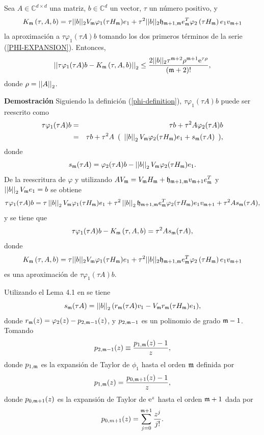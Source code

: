  \begin{lemma}\cite{naranjo2021locally}\label{lemma:CORRECTED-ERROR}
	Sea $A\in\mathbb{C}^{d\times d}$ una matriz, $b\in\mathbb{C}^{d}$ un vector, $\tau$ un número positivo, y \[{K_{\mathfrak{m}}\left(\tau,A , b \right) = \tau ||b||_2 V_{\mathfrak{m}} \varphi_1(\tau H_{\mathfrak{m}})e_1}+\tau^2 ||b||_2 \mathfrak{h}_{\mathfrak{m}+1,\mathfrak{m}}e_{\mathfrak{m}}^T\varphi_2\left(\tau H_{\mathfrak{m}}\right) e_1 v_{\mathfrak{m}+1} \] la aproximación a $\tau \varphi_1(\tau A)b$ tomando los dos primeros términos de la serie (\ref{PHI-EXPANSION}). Entonces,
	\begin{gather*}
	\left\lvert\left\lvert \tau\varphi_1(\tau A)b - K_{\mf}\left(\tau,A , b \right) \right\rvert\right\rvert_2%
	\leq \frac{2\vert\lvert b \rvert\rvert_2\tau^{\mf+2}\rho^{\mf+1}\me{\tau \rho}}{(\mf+2)!},
	\end{gather*}
	donde $\rho=\left\lvert \left\lvert A \right\rvert \right\rvert_2$.
\end{lemma}
\textbf{Demostración}
Siguiendo la definición (\ref{phi-definition}), $\tau \varphi_1(\tau A)b$ puede ser reescrito como
\begin{eqnarray*}
	\tau \varphi_1(\tau A)b &=& \tau b+\tau^{2}A\varphi_{2}(\tau A)b \\
	&=& \tau b+\tau^{2}A \,\ (\,\ \nnorm{\nnorm{b}}_2V_\mf\varphi_{2}(\tau H_\mf)e_1 +s_\mf(\tau A) \,\ ), %
\end{eqnarray*}
donde \[ s_{\mathfrak{m}} (\tau A)= \varphi_{2}(\tau A)b -\left\lvert \left\lvert b \right\rvert \right\rvert_2V_{\mathfrak{m}}\varphi_{2}(\tau H_{\mathfrak{m}})e_1 .\]
De la reescritura de $\varphi$ y utilizando $AV_{\mathfrak{m}}=V_{\mathfrak{m}} H_{\mathfrak{m}} + \mathfrak{h}_{\mathfrak{m}+1,\mathfrak{m}}v_{\mathfrak{m}+1}e^{T}_{\mathfrak{m}}$ y  $\left\lvert \left\lvert b \right\rvert \right\rvert_2V_{\mathfrak{m}} e_1=b$ se obtiene
\begin{equation}
\tau\varphi_1(\tau A)b = \tau\nnorm{\nnorm{b}}_2V_\mf\varphi_1(\tau H_\mf)e_1 + \tau^{2}\nnorm{\nnorm{b}}_2\hf_{\mf+1,\mf}e^T_\mf\varphi_{2}(\tau H_\mf)e_1v_{\mf+1}+\tau^{2}As_\mf (\tau A), %
\end{equation}
y se tiene que
\begin{equation}
\tau\varphi_1(\tau A)b - K_{\mathfrak{m}}\left(\tau,A , b \right) = \tau^{2}As_{\mathfrak{m}}(\tau A), \label{eq:phidiffasm}
\end{equation}
donde \[{K_{\mathfrak{m}}\left(\tau,A , b \right) = \tau ||b||_2 V_{\mathfrak{m}} \varphi_1(\tau H_{\mathfrak{m}})e_1}+\tau^2 ||b||_2 \mathfrak{h}_{\mathfrak{m}+1,\mathfrak{m}}e_{\mathfrak{m}}^T\varphi_2\left(\tau H_{\mathfrak{m}}\right) e_1 v_{\mathfrak{m}+1} \] es una aproximación de $\tau \varphi_1(\tau A)b$.

Utilizando el Lema 4.1 en \cite{Saad92} se tiene
\begin{equation}
s_{\mathfrak{m}}(\tau A)=\left\lvert \left\lvert b \right\rvert \right\rvert_2 ( r_{\mathfrak{m}}(\tau A)v_1-V_{\mathfrak{m}} r_{\mathfrak{m}}(\tau H_{\mathfrak{m}})e_1) ,\label{eq:smeq}
\end{equation}
donde $r_{\mathfrak{m}}(z) = \varphi_{2}(z)-p_{2,\mathfrak{m}-1}(z)$, y $p_{2,\mathfrak{m}-1}$ es un polinomio de grado $\mathfrak{m}-1$. Tomando
\begin{equation*}
p_{2,\mathfrak{m}-1}(z)\equiv \frac{p_{1,\mathfrak{m}}(z)-1}{z},
\end{equation*}
donde $p_{1,\mathfrak{m}}$ es la expansión de Taylor de $\phi_1$ hasta el orden  $\mathfrak{m}$
definida por
\[ p_{1,\mathfrak{m}}(z)= \frac{p_{0,\mathfrak{m}+1}(z)-1}{z}, \]
donde $p_{0,\mathfrak{m}+1}(z)$  es la expansión de Taylor de $\mathrm{e}^{z}$ hasta el orden $\mathfrak{m}+1$ dada por
\[ p_{0,m+1}(z)=\sum\limits^{\mathfrak{m}+1}_{j=0}\frac{z^j}{j!}. \]

